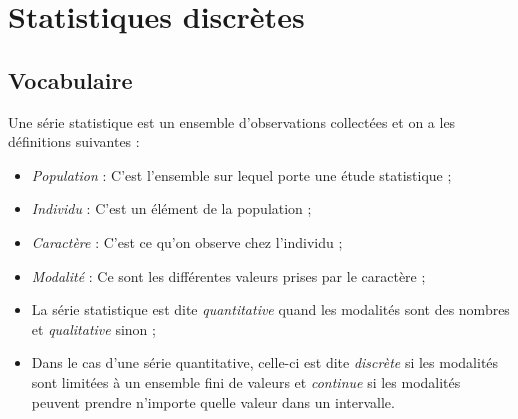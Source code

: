 \chapter{Statistiques discr\`etes} \label{statistiques1}
\minitoc

\fancyhead{} %
\fancyhead[LE,RO]{\footnotesize \em \rightmark} %

    \fancyfoot{}
    \fancyfoot[LE,RO]{\textbf{\thepage}}



\section{Vocabulaire}


\begin{definition}
Une s\'erie statistique est un ensemble d'observations collect\'ees et on a les d\'efinitions suivantes :
\begin{itemize}
	\item \emph{Population} : C'est l'ensemble sur lequel porte une \'etude statistique ;
	\item \emph{Individu} : C'est un \'el\'ement de la population ;
	\item \emph{Caract\`ere} : C'est ce qu'on observe chez l'individu ;
	\item \emph{Modalit\'e} : Ce sont les diff\'erentes valeurs prises par le caract\`ere ;
	\item La s\'erie statistique est dite \emph{quantitative} quand les modalit\'es sont des nombres %
		et \emph{qualitative} sinon ; %
	\item Dans le cas d'une s\'erie quantitative, celle-ci est dite \emph{discr\`ete} si les modalit\'es sont limit\'ees \`a un ensemble fini de valeurs %
	    et \emph{continue} si les modalit\'es peuvent prendre n'importe quelle valeur dans un intervalle. %
\end{itemize}
\end{definition}

